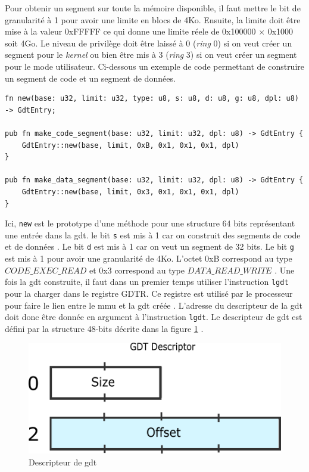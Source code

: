 Pour obtenir un  segment sur toute la mémoire disponible, il faut mettre le bit
de granularité à 1 pour avoir une limite en blocs de 4Ko. Ensuite, la limite doit
être mise à la valeur 0xFFFFF ce qui donne une limite réele de 0x100000 $\times$
0x1000 soit 4Go. Le niveau de privilège doit être laissé à 0 (\textit{ring} 0)
si on veut créer un segment pour le \textit{kernel} ou bien être mis à 3 (\textit{ring}
3) si on veut créer un segment pour le mode utilisateur. Ci-dessous un exemple de
code permettant de construire un segment de code et un segment de données. \\

\begin{verbatim}
fn new(base: u32, limit: u32, type: u8, s: u8, d: u8, g: u8, dpl: u8) -> GdtEntry;

pub fn make_code_segment(base: u32, limit: u32, dpl: u8) -> GdtEntry {
    GdtEntry::new(base, limit, 0xB, 0x1, 0x1, 0x1, dpl)
}

pub fn make_data_segment(base: u32, limit: u32, dpl: u8) -> GdtEntry {
    GdtEntry::new(base, limit, 0x3, 0x1, 0x1, 0x1, dpl)
}
\end{verbatim}

Ici, \texttt{new} est le prototype d'une méthode pour une structure 64
bits représentant une entrée dans la \acrshort{gdt}. le bit \texttt{s}
est mis à 1 car on construit des segments de code et de données \cite{ref66}.
Le bit \texttt{d} est mis à 1 car on veut un segment de 32 bits. Le bit
\texttt{g} est mis à 1 pour avoir une granularité de 4Ko. L'octet 0xB
correspond au type $CODE\_EXEC\_READ$ et 0x3 correspond au type $DATA\_READ\_WRITE$
\cite{ref42}. Une fois la \acrshort{gdt} construite, il faut dans un premier temps
utiliser l'instruction \texttt{lgdt} pour la charger dans le registre
GDTR. Ce registre est utilisé par le processeur pour faire le lien entre le \acrshort{mmu}
et la \acrshort{gdt} créée \cite{ref66}. L'adresse du descripteur de la \acrshort{gdt}
doit donc être donnée en argument à l'instruction \texttt{lgdt}. Le
descripteur de \acrshort{gdt} est défini par la structure 48-bits décrite dans
la figure \ref{gdt_descriptor} \cite{ref14}.

\begin{figure}[!h]
  \centering
  \includegraphics[scale=0.5]{images/gdt_descriptor.png}
  \caption{Descripteur de \acrshort{gdt}}
  \label{gdt_descriptor}
\end{figure}


